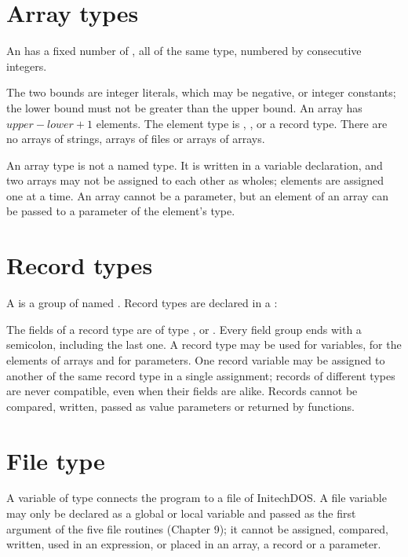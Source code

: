 \section{Array types}
An  has a fixed number of , all of the same
type, numbered by consecutive integers.


The two bounds are integer literals, which may be negative, or integer
constants; the lower bound must not be greater than the upper bound.  An
array has $\textit{upper} - \textit{lower} + 1$ elements.  The element type
is , ,  or a record type.  There are no
arrays of strings, arrays of files or arrays of arrays.

An array type is not a named type.  It is written in a variable
declaration, and two arrays may not be assigned to each other as wholes;
elements are assigned one at a time.  An array cannot be a parameter, but
an element of an array can be passed to a  parameter of the
element's type.

\section{Record types}
A  is a group of named .  Record types are
declared in a :


The fields of a record type are of type ,  or
.  Every field group ends with a semicolon, including the last
one.  A record type may be used for variables, for the elements of arrays
and for  parameters.  One record variable may be assigned to
another of the same record type in a single assignment; records of
different types are never compatible, even when their fields are alike.
Records cannot be compared, written, passed as value parameters or
returned by functions.

\section{File type}
A variable of type  connects the program to a file of InitechDOS.
A file variable may only be declared as a global or local variable and
passed as the first argument of the five file routines (Chapter 9); it
cannot be assigned, compared, written, used in an expression, or placed in
an array, a record or a parameter.

